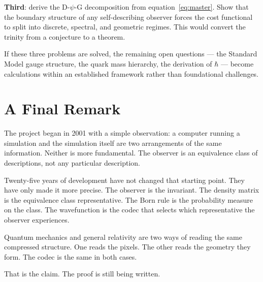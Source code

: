 \textbf{Third}: derive the D-$\psi$-G decomposition from
equation~\eqref{eq:master}. Show that the boundary structure of any
self-describing observer forces the cost functional to split into
discrete, spectral, and geometric regimes. This would convert the
trinity from a conjecture to a theorem.

If these three problems are solved, the remaining open questions ---
the Standard Model gauge structure, the quark mass hierarchy, the
derivation of $\hbar$ --- become calculations within an established
framework rather than foundational challenges.

\section{A Final Remark}

The project began in 2001 with a simple observation: a computer running
a simulation and the simulation itself are two arrangements of the same
information. Neither is more fundamental. The observer is an
equivalence class of descriptions, not any particular description.

Twenty-five years of development have not changed that starting point.
They have only made it more precise. The observer is the invariant. The
density matrix is the equivalence class representative. The Born rule
is the probability measure on the class. The wavefunction is the codec
that selects which representative the observer experiences.

Quantum mechanics and general relativity are two ways of reading the
same compressed structure. One reads the pixels. The other reads the
geometry they form. The codec is the same in both cases.

That is the claim. The proof is still being written.
